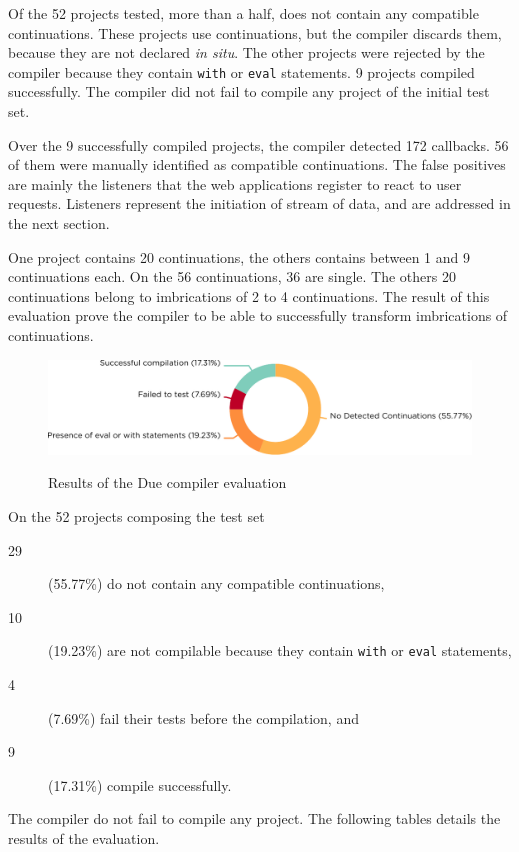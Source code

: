 Of the \num{52} projects tested, more than a half, does not contain any compatible continuations.
These projects use continuations, but the compiler discards them, because they are not declared \textit{in situ}.
The other projects were rejected by the compiler because they contain \texttt{with} or \texttt{eval} statements. %
\num{9} projects compiled successfully.
The compiler did not fail to compile any project of the initial test set.

Over the \num{9} successfully compiled projects, the compiler detected \num{172} callbacks.
56 of them were manually identified as compatible continuations.
The false positives are mainly the listeners that the web applications register to react to user requests.
Listeners represent the initiation of stream of data, and are addressed in the next section.

One project contains \num{20} continuations, the others contains between \num{1} and \num{9} continuations each.
On the \num{56} continuations, \num{36} are single. %
The others \num{20} continuations belong to imbrications of 2 to 4 continuations.
The result of this evaluation prove the compiler to be able to successfully transform imbrications of continuations.

\begin{figure}[h!]
  \centering
  \includegraphics[width=\linewidth]{../resources/due-evaluation.pdf}
  \label{fig:due-evaluation}
  \caption{Results of the Due compiler evaluation}
\end{figure}

On the \num{52} projects composing the test set
\begin{description}
\item[29] (55.77\%) do not contain any compatible continuations,
\item[10] (19.23\%) are not compilable because they contain \texttt{with} or \texttt{eval} statements,
\item[4] (7.69\%) fail their tests before the compilation, and
\item[9] (17.31\%) compile successfully.
\end{description}
The compiler do not fail to compile any project.
The following tables details the results of the evaluation.

